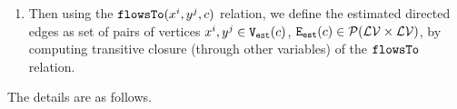 \begin{enumerate}
 We also prove it is a sound approximation 
 of the \emph{variable may-dependency} relation, $\vardep(x^i, y^j, c)$ for every $x^i, y^j \in \lvar(c)$.
\item 
Then 
using the $\mathtt{flowsTo}(x^i, y^j, c)$ relation, we define the estimated directed edges
as set of pairs of vertices $x^i, y^j\in \mathtt{{V_{est}}}(c)$,
$\mathtt{{E_{est}}}(c) \in \mathcal{P}( \mathcal{LV} \times \mathcal{LV})$, by computing
transitive closure (through other variables) of the 
 $\mathtt{flowsTo}$ relation.
\end{enumerate} 
The details are as follows.
%
